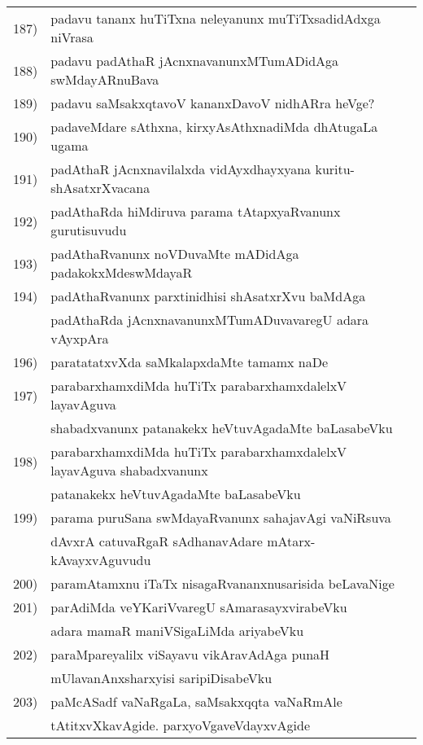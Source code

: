 {\begin{longtable}{@{}cp{7.4cm}r}
187) & padavu tananx huTiTxna neleyanunx muTiTxsadidAdxga niVrasa & \pageref{page182}\\ 
188) & padavu padAthaR jAcnxnavanunxMTumADidAga swMdayARnu\-Bava & \pageref{page200}\\
189) & padavu saMsakxqtavoV kananxDavoV nidhARra heVge? &  \pageref{page7}\\
190) & padaveMdare sAthxna, kirxyAsAthxnadiMda dhAtugaLa ugama & \pageref{page1}\\
191) & padAthaR jAcnxnavilalxda vidAyxdhayxyana kuritu-shAsatxrXvacana & \pageref{page39}\\
192) & padAthaRda hiMdiruva parama tAtapxyaRvanunx gurutisuvudu & \pageref{page240}\\
193) & padAthaRvanunx noVDuvaMte mADidAga padakokxMde\break swMdayaR & \pageref{page201}\\
194) & padAthaRvanunx parxtinidhisi shAsatxrXvu baMdAga  & \\
     & padAthaRda jAcnxnavanunxMTumADuvavaregU adara vAyxpAra & \pageref{page198}\\
196) & paratatatxvXda saMkalapxdaMte tamamx naDe &  \pageref{page198}\\
197) & parabarxhamxdiMda huTiTx parabarxhamxdalelxV layavAguva & \\
     & shabadxvanunx patanakekx heVtuvAgadaMte baLasabeVku & \pageref{page192}\\
198) & parabarxhamxdiMda huTiTx parabarxhamxdalelxV layavAguva shabadxvanunx& \\ 
     & patanakekx heVtuvAgadaMte baLasabeVku  & \pageref{page192}\\
199) & parama puruSana swMdayaRvanunx sahajavAgi vaNiRsuva & \\
     & dAvxrA catuvaRgaR sAdhanavAdare mAtarx-kAvayxvAguvudu & \pageref{page193}\\ 
200) & paramAtamxnu iTaTx nisagaRvananxnusarisida beLavaNige & \pageref{page77}\\
201) & parAdiMda veYKariVvaregU sAmarasayxvirabeVku & \\
     & adara mamaR maniVSigaLiMda ariyabeVku & \pageref{page204}  \\
202) & paraMpareyalilx viSayavu vikAravAdAga punaH & \\
     & mUlavanAnxsharxyisi saripiDisabeVku & \pageref{page167}\\
203) & paMcASadf vaNaRgaLa, saMsakxqqta vaNaRmAle & \\
     & tAtitxvXkavAgide. parxyoVgaveVdayxvAgide & \pageref{page185}\\

\end{longtable}}
